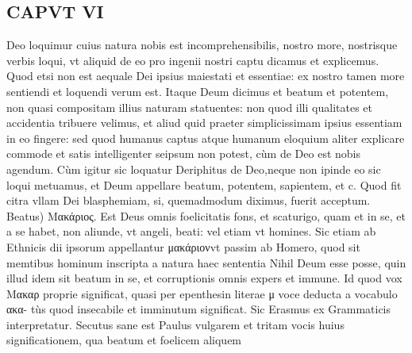 \documentclass{article}
\begin{document}
\begin{pages}
\section*{CAPVT VI }
\marginpar{[ p.481 ]}\pstart Deo loquimur cuius natura nobis est incomprehensibilis, nostro more, nostrisque verbis loqui, vt aliquid de eo pro ingenii nostri captu dicamus et explicemus. Quod etsi non est aequale Dei ipsius maiestati et essentiae: ex nostro tamen more sentiendi et loquendi verum est. Itaque  Deum dicimus et beatum et potentem, non quasi compositam illius naturam statuentes: non quod illi qualitates et accidentia tribuere velimus, et aliud quid praeter simplicissimam ipsius essentiam in eo fingere: sed quod humanus captus atque humanum eloquium aliter explicare commode et satis intelligenter seipsum non potest, cùm de Deo est nobis agendum. Cùm igitur sic loquatur Deriphitus de Deo,neque non ipinde eo sic loqui metuamus, et Deum appellare beatum, potentem, sapientem, et c. Quod fit citra vllam Dei blasphemiam, si, quemadmodum diximus, fuerit acceptum.  \pend\pstart Beatus) Μακάριος. Est Deus omnis foelicitatis fons, et scaturigo, quam et in se, et a se habet, non aliunde, vt angeli, beati: vel etiam vt homines. Sic etiam ab Ethnicis dii ipsorum appellantur μακάριονvt passim ab Homero, quod sit memtibus hominum inscripta a natura haec sententia Nihil Deum esse posse, quin illud idem sit beatum in se, et corruptionis omnis expers et immune. Id quod vox Μακαρ proprie significat, quasi per epenthesin literae μ voce deducta a vocabulo ακα- tùs quod insecabile et imminutum significat. Sic Erasmus ex Grammaticis interpretatur. Secutus sane est Paulus vulgarem et tritam vocis huius significationem, qua beatum et foelicem aliquem  \pend

\end{pages}
\end{document}
